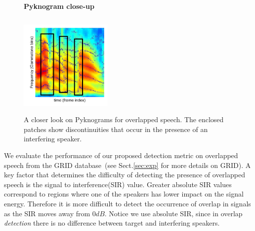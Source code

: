 {\begin{figure}[h!]
\centering
\vspace{1mm}
    \textbf{Pyknogram close-up}\par\medskip
\vspace{-1mm}
\includegraphics[height =2.0in, width=0.4\textwidth]{figures/co-channel_pyknogram-crop}
\vspace{-1mm}
\caption{A closer look on Pyknograms for overlapped speech. The enclosed patches show discontinuities that occur in the presence of an interfering speaker.}
\vspace{-1mm}
\label{fig:pyknograms_for_overlaps}
\end{figure}


We evaluate the performance of our proposed detection metric on overlapped speech from the GRID database~\cite{SSC_link}(see Sect.\ref{sec:exp} for more details on GRID). 
A key factor that determines the difficulty of detecting the presence of overlapped speech is the signal to interference(SIR) value. 
Greater absolute SIR values correspond to regions where one of the speakers has lower impact on the signal energy. 
Therefore it is more difficult to detect the occurrence of overlap in signals as the SIR moves away from $0dB$. 
Notice we use absolute SIR, since in overlap {\it detection} there is no difference between target and interfering speakers. 

}
